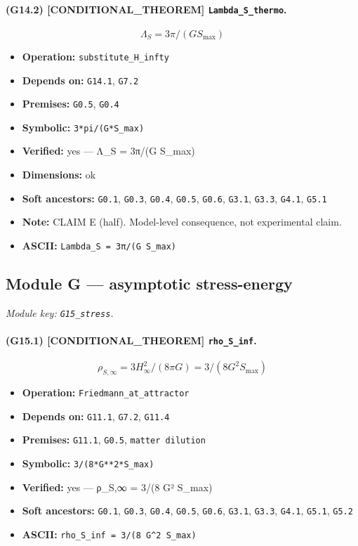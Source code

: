 \documentclass[11pt,a4paper]{article}
\theoremstyle{remark}\newtheorem*{caution}{Caution}
\newcommand{\tagbox}[1]{\textsc{[#1]}}
\begin{document}
\paragraph{(G14.2) \tagbox{CONDITIONAL\_THEOREM} \texttt{Lambda\_S\_thermo}.}
\begin{equation}
\Lambda_S=3\pi/(G S_{\max})
\tag{G14.2}
\end{equation}
\begin{itemize}\setlength{\itemsep}{0.12em}
\item \textbf{Operation:} \texttt{substitute\_H\_infty}
\item \textbf{Depends on:} \texttt{G14.1}, \texttt{G7.2}
\item \textbf{Premises:} \texttt{G0.5}, \texttt{G0.4}
\item \textbf{Symbolic:} \texttt{3*pi/(G*S\_max)}
\item \textbf{Verified:} yes --- Λ\_S = 3π/(G S\_max)
\item \textbf{Dimensions:} ok
\item \textbf{Soft ancestors:} \texttt{G0.1}, \texttt{G0.3}, \texttt{G0.4}, \texttt{G0.5}, \texttt{G0.6}, \texttt{G3.1}, \texttt{G3.3}, \texttt{G4.1}, \texttt{G5.1}
\item \textbf{Note:} CLAIM E (half). Model-level consequence, not experimental claim.
\item \textbf{ASCII:} \texttt{Lambda\_S = 3π/(G S\_max)}
\end{itemize}
\subsection{Module G --- asymptotic stress-energy}
\textit{Module key: \texttt{G15\_stress}.}
\paragraph{(G15.1) \tagbox{CONDITIONAL\_THEOREM} \texttt{rho\_S\_inf}.}
\begin{equation}
\rho_{S,\infty}=3H_\infty^2/(8\pi G)=3/(8 G^2 S_{\max})
\tag{G15.1}
\end{equation}
\begin{itemize}\setlength{\itemsep}{0.12em}
\item \textbf{Operation:} \texttt{Friedmann\_at\_attractor}
\item \textbf{Depends on:} \texttt{G11.1}, \texttt{G7.2}, \texttt{G11.4}
\item \textbf{Premises:} \texttt{G11.1}, \texttt{G0.5}, \texttt{matter dilution}
\item \textbf{Symbolic:} \texttt{3/(8*G**2*S\_max)}
\item \textbf{Verified:} yes --- ρ\_S,∞ = 3/(8 G² S\_max)
\item \textbf{Soft ancestors:} \texttt{G0.1}, \texttt{G0.3}, \texttt{G0.4}, \texttt{G0.5}, \texttt{G0.6}, \texttt{G3.1}, \texttt{G3.3}, \texttt{G4.1}, \texttt{G5.1}, \texttt{G5.2}
\item \textbf{ASCII:} \texttt{rho\_S\_inf = 3/(8 G^2 S\_max)}
\end{itemize}
\end{document}

